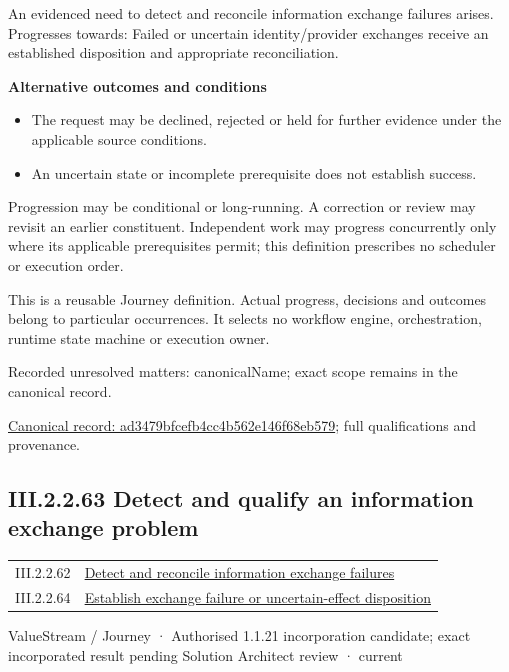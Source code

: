 An evidenced need to detect and reconcile information exchange failures arises. Progresses towards: Failed or uncertain identity/provider exchanges receive an established disposition and appropriate reconciliation.



\par\medskip\textbf{Alternative outcomes and conditions}\par


\begin{itemize}


\item The request may be declined, rejected or held for further evidence under the applicable source conditions.

\item An uncertain state or incomplete prerequisite does not establish success.

\end{itemize}


Progression may be conditional or long-running. A correction or review may revisit an earlier constituent. Independent work may progress concurrently only where its applicable prerequisites permit; this definition prescribes no scheduler or execution order.



This is a reusable Journey definition. Actual progress, decisions and outcomes belong to particular occurrences. It selects no workflow engine, orchestration, runtime state machine or execution owner.


{\small Recorded unresolved matters: canonicalName; exact scope remains in the canonical record.}\par
{\footnotesize \href{../../../../continuum/strategy/value-stream/ad3479bfcefb4cc4b562e146f68eb579.md}{Canonical record: ad3479bfcefb4cc4b562e146f68eb579}; full qualifications and provenance.}\par
\subsection*{III.2.2.63 Detect and qualify an information exchange problem}
\label{navigation:III.2.2.63}

\begin{longtable}{p{.22\linewidth}p{.73\linewidth}}
III.2.2.62 & \hyperref[element:ad3479bfcefb4cc4b562e146f68eb579]{Detect and reconcile information exchange failures} \\
III.2.2.64 & \hyperref[element:f49ed7138ad1435a94cb1f509aaf0b8d]{Establish exchange failure or uncertain-effect disposition} \\
\end{longtable}
\label{element:0e171ae23faf436a90fe7a85889acd5c}
{\small ValueStream / Journey · Authorised 1.1.21 incorporation candidate; exact incorporated result pending Solution Architect review · current}\par

